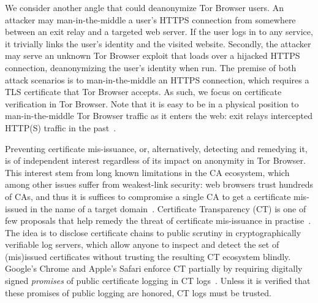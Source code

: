 %
%
We consider another angle that could deanonymize Tor Browser users.
An attacker may man-in-the-middle a user's HTTPS connection from somewhere
between an exit relay and a targeted web server.  If the user logs in to any
service, it trivially links the user's identity and the visited website.
Secondly, the attacker may serve an unknown Tor Browser exploit that loads over
a hijacked HTTPS connection, deanonymizing the user's identity when run.
The premise of both attack scenarios is to man-in-the-middle an HTTPS
connection, which requires a TLS certificate that Tor Browser accepts.  As
such, we focus on certificate verification in Tor Browser.  Note that it is
easy to be in a physical position to man-in-the-middle Tor Browser traffic as
it enters the web:
	exit relays intercepted HTTP(S) traffic in the past~\cite{spoiled-onions}.

%
Preventing certificate mis-issuance, or, alternatively, detecting and remedying
it, is of independent interest regardless of its impact on anonymity in Tor
Browser.  This interest stem from long known limitations in the CA ecosystem,
which among other issues suffer from weakest-link security:
	web browsers trust hundreds of CAs, and thus it is suffices to compromise
	a single CA to get a certificate mis-issued in the name of a target
	domain~\cite{ca-ecosystem,https-sok}.
Certificate Transparency (CT) is one of few proposals that help remedy the
threat of certificate mis-issuance in practise~\cite{ct/a,ct,ct/bis}.  The idea
is to disclose certificate chains to public scrutiny in cryptographically
verifiable log servers, which allow anyone to inspect and detect the set of
(mis)issued certificates without trusting the resulting CT ecosystem blindly.
Google's Chrome and Apple's Safari enforce CT partially by requiring
digitally signed \emph{promises} of public certificate logging in CT
logs~\cite{chrome-policy,safari-policy}.  Unless it is verified that these
promises of public logging are honored, CT logs must be trusted.

